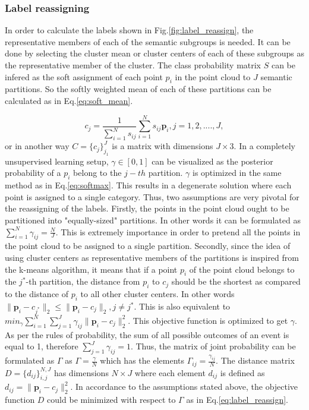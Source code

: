 \subsubsection*{Label reassigning}
In order to calculate the labels shown in Fig.\ref{fig:label_reassign}, the representative members of each of the semantic subgroups is needed. It can be done by selecting the cluster mean or cluster centers of each of these subgroups as the representative member of the cluster. The class probability matrix $S$ can be infered as the soft assignment of each point $p_i$ in the point cloud to $J$ semantic partitions. So the softly weighted mean of each of these partitions can be calculated as in Eq.\ref{eq:soft_mean}.

\begin{equation}
    \label{eq:soft_mean}
    \mathit{c_{j}}= \mathit{\frac{1}{\sum_{i=1}^{N}s_{ij}}\sum_{i=1}^{N}s_{ij}\mathbf{p}_i, j = 1,2,....,J}, 
\end{equation}
or in another way $C= \{c_j\}_{j_1}^J$ is a matrix with dimensions $J \times 3$. In a completely unsupervised learning setup, $\gamma \in [0,1]$ can be visualized as the posterior probability of a $p_i$ belong to the $j-th$ partition. $\gamma$ is optimized in the same method as in Eq.\ref{eq:softmax}. This results in a degenerate solution where each point is assigned to a single category. Thus, two assumptions are very pivotal for the reassigning of the labels. Firstly, the points in the point cloud ought to be partitioned into "equally-sized" partitions. In other words it can be formulated as $\mathit{\sum_{i=1}^{N}\gamma_{ij} = \frac{N}{J}}$. This is extremely importance in order to pretend all the points in the point cloud to be assigned to a single partition. Secondly, since the idea of using cluster centers as representative members of the partitions is inspired from the k-means algorithm, it means that if a point $p_i$ of the point cloud belongs to the $j^{*}$-th partition, the distance from $p_i$ to $c_j$ should be the shortest as compared to the distance of $p_i$ to all other cluster centers. In other words $ \lVert \mathbf{p}_i - c_{j^*} \rVert _2 \leq \lVert \mathbf{p}_i - c_{j} \rVert _2, j \neq j^* $. This is also equivalent to $ min_{\gamma}\sum_{i=1}^{N}\sum_{j=1}^{J} \gamma_{ij} \lVert \mathbf{p}_i - c_{j} \rVert _2^2$. This objective function is optimized to get $\gamma$. As per the rules of probability, the sum of all possible outcomes of an event is equal to 1, therefore $\sum_{j=1}^{J} \gamma_{ij} = 1$. Thus, the matrix of joint probability can be formulated as $\Gamma$ as $\Gamma = \frac{\gamma}{N}$ which has the elements $\Gamma_{ij} = \frac{\gamma_{ij}}{N}$. The distance matrix $\mathit{D = \{d_{ij}\}_{i,j}^{N,J}}$ has dimensions $\mathit{N \times J}$ where each element $\mathit{d_{ij}}$ is defined as $\mathit{d_{ij}} = \lVert \mathbf{p}_i - c_{j} \rVert _2^2$. In accordance to the assumptions stated above, the objective function $\mathit{D}$ could be minimized with respect to $\Gamma$ as in Eq.\ref{eq:label_reassign}.
